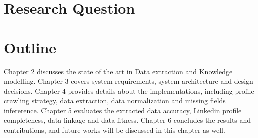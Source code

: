 %
%

\section{Research Question}

\section{Outline}
Chapter 2 discusses the state of the art in Data extraction and Knowledge modelling.
Chapter 3 covers system requirements, system architecture and design decisions.
Chapter 4 provides details about the implementations, including profile crawling strategy, data extraction, data normalization and missing fields infererence.
Chapter 5 evaluates the extracted data accuracy, Linkedin profile completeness, data linkage and data fitness.
Chapter 6 concludes the results and contributions, and future works will be discussed in this chapter as well.
